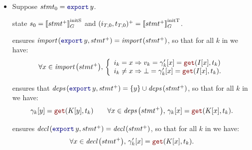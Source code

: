 \begin{skippableproof}
\begin{itemize}
\begin{itemize}
                        We apply the induction hypothesis to state that for all statement $stmt$
                        from the block $stmt^+$ we have  holds.

                        Furthermore, because we have $K[y] \equiv I[y]$, the rule
                         ensures that the judgement
                        holds.

                  \item Suppose $stmt_0 = \export{y}$.

                         state $s_0 = \left\llbracket stmt^+ \right\rrbracket_G^\text{initS}$ and
                        $(i_{T, 0}, t_{T, 0})^+ = \left\llbracket stmt^+ \right\rrbracket_G^\text{initT}$.

                         ensures
                        $\importSet{\export{y}, stmt^+} = \importSet{stmt^+}$, so that for all $k$
                        in \N we have:
                        \begin{equation*}
                            \forall x \in \importSet{stmt^+}, \,
                            \left\{\begin{array}{l}
                                i_k = x \Rightarrow v_k = \gamma'_k[x] = \getAt{I[x]}{t_k} \\
                                i_k \neq x \Rightarrow \bot = \gamma'_k[x] = \getAt{I[x]}{t_k}.
                            \end{array}\right.
                        \end{equation*}

                         ensures that
                        $\depSet{\export{y}, stmt^+} = \{y\} \cup \depSet{stmt^+}$, so that for all
                        $k$ in \N we have:
                        \begin{equation*}
                            \gamma_k[y] = \getAt{K[y]}{t_k} \qquad
                            \forall x \in \depSet{stmt^+}, \, \gamma_k[x] = \getAt{K[x]}{t_k}.
                        \end{equation*}

                         ensures
                        $\declSet{\export{y}, stmt^+} = \declSet{stmt^+}$, so that for all $k$ in \N
                        we have:
                        \begin{equation*}
                            \forall x \in \declSet{stmt^+}, \, \gamma'_k[x] = \getAt{K[x]}{t_k}.
                        \end{equation*}


\end{itemize}
\end{itemize}
\end{skippableproof}
